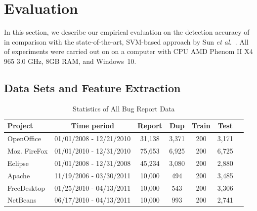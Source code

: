 \section{Evaluation}
\label{eval}

In this section, we describe our empirical evaluation on the detection
accuracy of {\model} in comparison with the state-of-the-art,
SVM-based approach by Sun {\em et al.}~\cite{davidlo10}. All of
experiments were carried out on on a computer with CPU AMD Phenom II
X4 965 3.0 GHz, 8GB RAM, and Windows~10.


\subsection{Data Sets and Feature Extraction}


\begin{table}[t]
\addtolength{\tabcolsep}{-3pt}
\centering
\scriptsize
\caption{Statistics of All Bug Report Data}
    \begin{tabular}{lcccccc}
    \hline
    Project &  Time period &  Report &  Dup  & Train & Test \\
    \hline
    OpenOffice & 01/01/2008 - 12/21/2010 & 31,138 & 3,371 & 200 & 3,171  \\
    Moz. FireFox &  01/01/2010 - 12/31/2010 & 75,653 & 6,925 & 200 & 6,725 \\
    Eclipse  &  01/01/2008 - 12/31/2008 & 45,234 & 3,080 & 200 & 2,880  \\
    \hline
    Apache  &  11/19/2006 - 03/30/2011 & 10,000 & 494   & 200 & 3,485 \\
    FreeDesktop &  01/25/2010 - 04/13/2011 & 10,000 & 543   & 200 & 3,306 \\
    NetBeans    & 06/17/2010 - 04/13/2011 & 10,000 & 993 & 200 & 2,741\\
    \hline
    \end{tabular}
\label{data}
\end{table}

